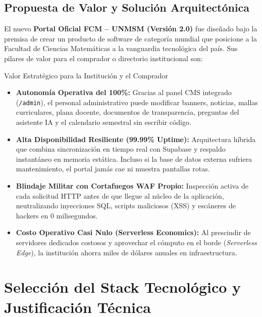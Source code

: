\documentclass[12pt,a4paper,oneside]{report}
\begin{document}
\section{Propuesta de Valor y Solución Arquitectónica}
El nuevo \textbf{Portal Oficial FCM -- UNMSM (Versión 2.0)} fue diseñado bajo la premisa de crear un producto de software de categoría mundial que posicione a la Facultad de Ciencias Matemáticas a la vanguardia tecnológica del país. Sus pilares de valor para el comprador o directorio institucional son:

\begin{cajaEjecutiva}{Valor Estratégico para la Institución y el Comprador}
\begin{itemize}[leftmargin=0.6cm, itemsep=3pt]
  \item \textbf{Autonomía Operativa del 100\%:} Gracias al panel CMS integrado (\texttt{/admin}), el personal administrativo puede modificar banners, noticias, mallas curriculares, plana docente, documentos de transparencia, preguntas del asistente IA y el calendario semestral sin escribir código.
  \item \textbf{Alta Disponibilidad Resiliente (99.99\% Uptime):} Arquitectura híbrida que combina sincronización en tiempo real con Supabase y respaldo instantáneo en memoria estática. Incluso si la base de datos externa sufriera mantenimiento, el portal jamás cae ni muestra pantallas rotas.
  \item \textbf{Blindaje Militar con Cortafuegos WAF Propio:} Inspección activa de cada solicitud HTTP antes de que llegue al núcleo de la aplicación, neutralizando inyecciones SQL, scripts maliciosos (XSS) y escáneres de hackers en 0 milisegundos.
  \item \textbf{Costo Operativo Casi Nulo (Serverless Economics):} Al prescindir de servidores dedicados costosos y aprovechar el cómputo en el borde (\textit{Serverless Edge}), la institución ahorra miles de dólares anuales en infraestructura.
\end{itemize}
\end{cajaEjecutiva}

\chapter{Selección del Stack Tecnológico y Justificación Técnica}
\end{document}
